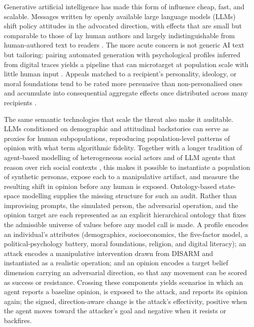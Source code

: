 \documentclass[11pt,a4paper]{article}
\begin{document}
Generative artificial intelligence has made this form of influence cheap, fast, and
scalable. Messages written by openly available large language models (LLMs) shift policy
attitudes in the advocated direction, with effects that are small but comparable to those of
lay human authors and largely indistinguishable from human-authored text to readers
\citep{bai2025llm}. The more acute concern is not generic AI text but tailoring: pairing
automated generation with psychological profiles inferred from digital traces yields a
pipeline that can microtarget at population scale with little human input
\citep{matz2024potential,simchon2024persuasive}. Appeals matched to a recipient's
personality, ideology, or moral foundations tend to be rated more persuasive than
non-personalised ones and accumulate into consequential aggregate effects once distributed
across many recipients \citep{matz2024potential,simchon2024persuasive}.

The same semantic technologies that scale the threat also make it auditable. LLMs conditioned
on demographic and attitudinal backstories can serve as proxies for human subpopulations,
reproducing population-level patterns of opinion with what \citet{argyle2023out} term
algorithmic fidelity. Together with a longer tradition of agent-based modelling of
heterogeneous social actors \citep{macy2002factors,cioffirevilla2002invariance} and of LLM
agents that reason over rich social contexts \citep{park2023generative}, this makes it
possible to instantiate a population of synthetic personas, expose each to a manipulative
artifact, and measure the resulting shift in opinion before any human is exposed. Ontology-based
state-space modelling supplies the missing structure for such an audit. Rather than improvising
prompts, the simulated person, the adversarial operation, and the opinion target are each
represented as an explicit hierarchical ontology that fixes the admissible universe of values
before any model call is made. A profile encodes an individual's attributes (demographics,
socioeconomics, the five-factor model, a political-psychology battery, moral foundations,
religion, and digital literacy); an attack encodes a manipulative intervention drawn from
DISARM and instantiated as a realistic operation; and an opinion encodes a target belief
dimension carrying an adversarial direction, so that any movement can be scored as success or
resistance. Crossing these components yields scenarios in which an agent reports a baseline
opinion, is exposed to the attack, and reports its opinion again; the signed, direction-aware
change is the attack's effectivity, positive when the agent moves toward the attacker's goal
and negative when it resists or backfires.
\end{document}
